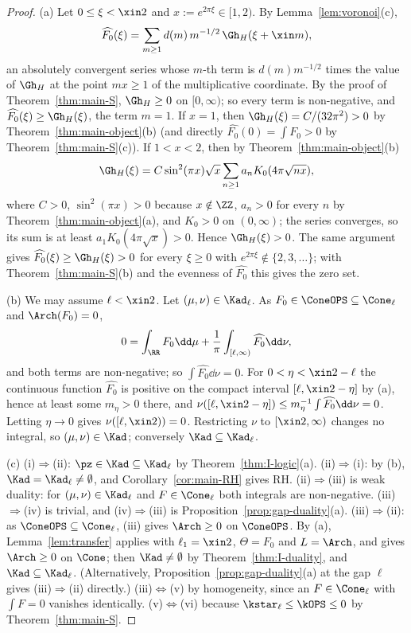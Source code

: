 \begin{proof}
(a) Let $0\le\xi<\xin2$ and $x:=e^{2\pi\xi}\in[1,2)$. By Lemma~\ref{lem:voronoi}(c),
\[
\widehat{F_0}(\xi)=\sum_{m\ge1}d(m)\,m^{-1/2}\,\Gh_H(\xi+\xin m),
\]
an absolutely convergent series whose $m$-th term is $d(m)m^{-1/2}$ times the value of $\Gh_H$ at the point $mx\ge1$ of the multiplicative
coordinate. By the proof of Theorem~\ref{thm:main-S}, $\Gh_H\ge0$ on $[0,\infty)$; so every term is non-negative, and
$\widehat{F_0}(\xi)\ge\Gh_H(\xi)$, the term $m=1$. If $x=1$, then $\Gh_H(\xi)=C/(32\pi^2)>0$ by Theorem~\ref{thm:main-object}(b) (and directly
$\widehat{F_0}(0)=\int F_0>0$ by Theorem~\ref{thm:main-S}(c)). If $1<x<2$, then by Theorem~\ref{thm:main-object}(b)
\[
\Gh_H(\xi)=C\sin^2(\pi x)\sqrt x\sum_{n\ge1}a_nK_0(4\pi\sqrt{nx}),
\]
where $C>0$, $\sin^2(\pi x)>0$ because $x\notin\ZZ$, $a_n>0$ for every $n$ by Theorem~\ref{thm:main-object}(a), and $K_0>0$ on $(0,\infty)$; the
series converges, so its sum is at least $a_1K_0(4\pi\sqrt x)>0$. Hence $\Gh_H(\xi)>0$. The same argument gives $\widehat{F_0}(\xi)\ge\Gh_H(\xi)>0$
for every $\xi\ge0$ with $e^{2\pi\xi}\notin\{2,3,\dots\}$; with Theorem~\ref{thm:main-S}(b) and the evenness of $\widehat{F_0}$ this gives the zero set.

(b) We may assume $\ell<\xin2$. Let $(\mu,\nu)\in\Kad_\ell$. As $F_0\in\ConeOPS\subseteq\Cone_\ell$ and $\Arch(F_0)=0$,
\[
0=\int_\RR F_0\dd\mu+\frac1\pi\int_{[\ell,\infty)}\widehat{F_0}\dd\nu ,
\]
and both terms are non-negative; so $\int\widehat{F_0}\dd\nu=0$. For $0<\eta<\xin2-\ell$ the continuous function $\widehat{F_0}$ is positive on the
compact interval $[\ell,\xin2-\eta]$ by (a), hence at least some $m_\eta>0$ there, and $\nu([\ell,\xin2-\eta])\le m_\eta^{-1}\int\widehat{F_0}\dd\nu=0$.
Letting $\eta\to0$ gives $\nu([\ell,\xin2))=0$. Restricting $\nu$ to $[\xin2,\infty)$ changes no integral, so $(\mu,\nu)\in\Kad$; conversely
$\Kad\subseteq\Kad_\ell$.

(c) (i)$\Rightarrow$(ii): $\pz\in\Kad\subseteq\Kad_\ell$ by Theorem~\ref{thm:I-logic}(a). (ii)$\Rightarrow$(i): by (b), $\Kad=\Kad_\ell\ne\emptyset$, and
Corollary~\ref{cor:main-RH} gives RH. (ii)$\Rightarrow$(iii) is weak duality: for $(\mu,\nu)\in\Kad_\ell$ and $F\in\Cone_\ell$ both integrals are
non-negative. (iii)$\Rightarrow$(iv) is trivial, and (iv)$\Rightarrow$(iii) is Proposition~\ref{prop:gap-duality}(a). (iii)$\Rightarrow$(ii): as
$\ConeOPS\subseteq\Cone_\ell$, (iii) gives $\Arch\ge0$ on $\ConeOPS$. By (a), Lemma~\ref{lem:transfer} applies with $\ell_1=\xin2$, $\Theta=F_0$ and $L=\Arch$,
and gives $\Arch\ge0$ on $\Cone$; then $\Kad\ne\emptyset$ by Theorem~\ref{thm:I-duality}, and $\Kad\subseteq\Kad_\ell$. (Alternatively,
Proposition~\ref{prop:gap-duality}(a) at the gap $\ell$ gives (iii)$\Rightarrow$(ii) directly.) (iii)$\Leftrightarrow$(v) by homogeneity, since an
$F\in\Cone_\ell$ with $\int F=0$ vanishes identically. (v)$\Leftrightarrow$(vi) because $\kstar_\ell\le\kOPS\le0$ by Theorem~\ref{thm:main-S}.


\end{proof}
